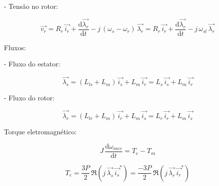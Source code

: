 - Tensão no rotor:

\begin{equation}
\label{eq:vrotor_gi}
 \vec{v_{r}} = R_r\,\vec{i_{r}} + \frac{\mathrm{d} \vec{\lambda_{r}}}{\mathrm{d} t} - j\,(\omega_s - \omega_r)\,\vec{\lambda_{r}} = R_r\,\vec{i_{r}} + \frac{\mathrm{d} \vec{\lambda_{r}}}{\mathrm{d} t} - j\,\omega_{sl}\,\vec{\lambda_{r}}
\end{equation}


Fluxos:

- Fluxo do estator:

\begin{equation}
\label{eq:lambda_s}
 \vec{\lambda_{s}} = (L_{ls} + L_m)\,\vec{i_{s}} + L_m\,\vec{i_{r}} = L_s\,\vec{i_{s}} + L_m\,\vec{i_{r}}
\end{equation}

- Fluxo do rotor:

\begin{equation}
\label{eq:lambda_r}
 \vec{\lambda_{r}} = (L_{lr} + L_m)\,\vec{i_{r}} + L_m\,\vec{i_{s}} = L_r\,\vec{i_{r}} + L_m\,\vec{i_{s}}
\end{equation}


Torque eletromagnético:

\begin{equation}
\label{eq:rel_Torque_mominercia_omegamec}
 J\,\frac{\mathrm{d} \omega_{mec}}{\mathrm{d} t} = T_e - T_m
\end{equation}

\begin{equation}
\label{eq:rel_Torque_flux_corr}
 T_e = \frac{3P}{2}\,\Re(j\,\vec{\lambda_{s}}\,\vec{i_{s}}^{*}) = \frac{-3P}{2}\,\Re(j\,\vec{\lambda_{r}}\,\vec{i_{r}}^{*})
\end{equation}



